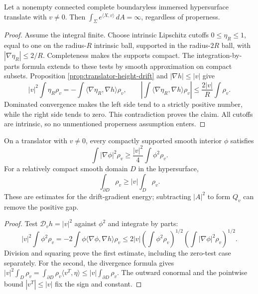 \begin{proposition}\label{prop:translator-infinite-weighted-area}
Let a nonempty connected complete boundaryless immersed hypersurface translate with $v\ne0$. Then $\int_\Sigma e^{\langle X,v\rangle}\,dA=\infty$, regardless of properness.
\end{proposition}
\begin{proof}
Assume the integral finite. Choose intrinsic Lipschitz cutoffs $0\le\eta_R\le1$, equal to one on the radius-$R$ intrinsic ball, supported in the radius-$2R$ ball, with $|\nabla\eta_R|\le2/R$. Completeness makes the supports compact. The integration-by-parts formula extends to these tests by smooth approximation on compact subsets. Proposition \ref{prop:translator-height-drift} and $|\nabla h|\le|v|$ give
\[
 |v|^2\int\eta_R\rho_v=-\int\langle\nabla\eta_R,\nabla h\rangle\rho_v,
 \qquad
 \left|\int\langle\nabla\eta_R,\nabla h\rangle\rho_v\right|
 \le\frac{2|v|}{R}\int\rho_v.
\]
Dominated convergence makes the left side tend to a strictly positive number, while the right side tends to zero. This contradiction proves the claim. All cutoffs are intrinsic, so no unmentioned properness assumption enters.
\end{proof}

\begin{proposition}\label{prop:translator-weighted-gradient-gap}
On a translator with $v\ne0$, every compactly supported smooth interior $\phi$ satisfies
\[
 \int|\nabla\phi|^2\rho_v\ge\frac{|v|^2}{4}\int\phi^2\rho_v.
\]
For a relatively compact smooth domain $D$ in the hypersurface,
\[
 \int_{\partial D}\rho_v\ge |v|\int_D\rho_v.
\]
These are estimates for the drift-gradient energy; subtracting $|A|^2$ to form $Q_v$ can remove the positive gap.
\end{proposition}
\begin{proof}
Test $\mathcal D_vh=|v|^2$ against $\phi^2$ and integrate by parts:
\[
 |v|^2\int\phi^2\rho_v=-2\int\phi\langle\nabla\phi,\nabla h\rangle\rho_v
 \le2|v|\left(\int\phi^2\rho_v\right)^{1/2}
             \left(\int|\nabla\phi|^2\rho_v\right)^{1/2}.
\]
Division and squaring prove the first estimate, including the zero-test case separately. For the second, the divergence formula gives
$|v|^2\int_D\rho_v=\int_{\partial D}\rho_v\langle v^T,\eta\rangle\le|v|\int_{\partial D}\rho_v$.
The outward conormal and the pointwise bound $|v^T|\le|v|$ fix the sign and constant.
\end{proof}

